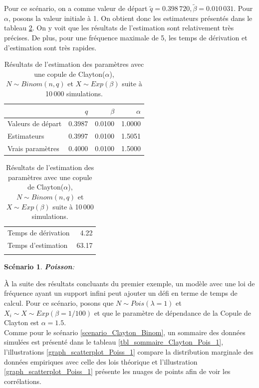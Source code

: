 \documentclass{article}
\newtheorem{Scenario}{Scénario}
\begin{document}
		Pour ce scénario, on a comme valeur de départ $\tilde{q} = 0.398\,720, \tilde{\beta} = 0.010\,031$. Pour $\alpha$, posons la valeur initiale à 1. On obtient donc les estimateurs présentés dans le tableau \ref{tbl_Clayton_Binom}. On y voit que les résultats de l'estimation sont relativement très précises. De plus, pour une fréquence maximale de 5, les temps de dérivation et d'estimation sont très rapides.
		
		\begin{table}[H]
			\centering
			\begin{tabular}{lrrr}
				\hline
				& $q$ & $\beta$ & $\alpha$ \\ 
				\hline
				Valeurs de départ & 0.3987 & 0.0100 & 1.0000 \\ 
				Estimateurs & 0.3997 & 0.0100 & 1.5051 \\ 
				Vrais paramètres & 0.4000 & 0.0100 & 1.5000 \\   
				\hline
			\end{tabular}
			\begin{tabular}{lr}
				\hline
				&  \\ 
				\hline
				Temps de dérivation & 4.22  \\ 
				Temps d'estimation & 63.17  \\  
				\\
				\hline
			\end{tabular}
			\caption[Résultats du scénario \ref{scenario_Clayton_Binom}]{Résultats de l'estimation des paramètres avec une copule de Clayton($\alpha$), $N\sim Binom(n,q)$ et $X \sim Exp(\beta)$ suite à 10\,000 simulations.} 
			\label{tbl_Clayton_Binom}
		\end{table}
		
		\begin{Scenario}\label{scenario_Clayton_Pois}
			\textbf{Poisson}:
		\end{Scenario}
	
		À la suite des résultats concluants du premier exemple, un modèle avec une loi de fréquence ayant un support infini peut ajouter un défi en terme de temps de calcul. Pour ce scénario, posons que $N \sim Pois(\lambda=1)$ et $X_i \sim X \sim Exp(\beta=1/100)$ et que le paramètre de dépendance de la Copule de Clayton est $\alpha = 1.5$. \\
		
		Comme pour le scénario \ref{scenario_Clayton_Binom}, un sommaire des données simulées est présenté dans le tableau \ref{tbl_sommaire_Clayton_Pois_1}, l'illustrations \ref{graph_scatterplot_Poiss_1} compare la distribution marginale des données empiriques avec celle des lois théorique et l'illustration \ref{graph_scatterplot_Poiss_1} présente les nuages de points afin de voir les corrélations.
		
\end{document}
